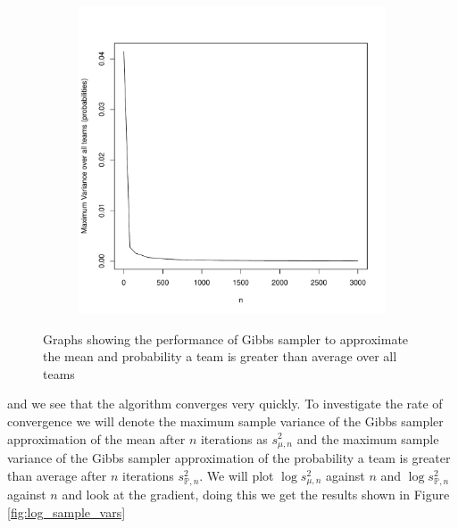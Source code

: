 \documentclass[11pt]{article} %
\begin{document}
\begin{figure}[h]
\begin{subfigure}{0.48\textwidth}
		\includegraphics[width=1.0\textwidth]{"../R File/var_probs"}
	\end{subfigure}	
	\caption{Graphs showing the performance of Gibbs sampler to approximate the mean and probability a team is greater than average over all teams}
	\label{fig:sample_vars_1}
\end{figure} and we see that the algorithm converges very quickly. To investigate the rate of convergence we will denote the maximum sample variance of the Gibbs sampler approximation of the mean after $n$ iterations as $s^2_{\mu, n}$ and the maximum sample variance of the Gibbs sampler approximation of the probability a team is greater than average after $n$ iterations $s^2_{\mathbb{P}, n}$. We will plot $\log s^2_{\mu, n}$ against $n$ and $\log s^2_{\mathbb{P}, n}$ against $n$ and look at the gradient, doing this we get the results shown in Figure \ref{fig:log_sample_vars}%
\end{document}
